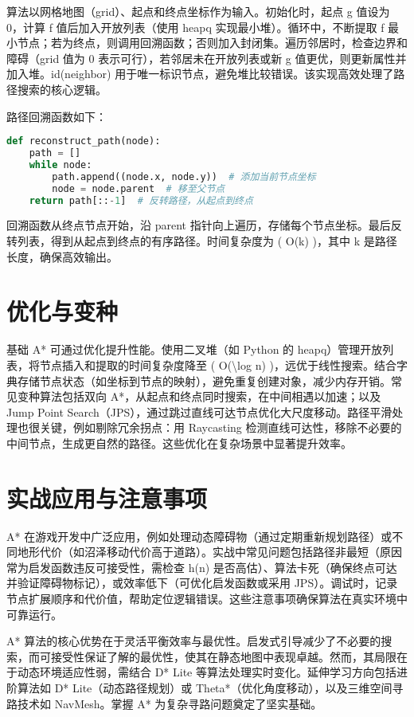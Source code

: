 算法以网格地图（grid）、起点和终点坐标作为输入。初始化时，起点 g 值设为 0，计算 f 值后加入开放列表（使用 heapq 实现最小堆）。循环中，不断提取 f 最小节点；若为终点，则调用回溯函数；否则加入封闭集。遍历邻居时，检查边界和障碍（grid 值为 0 表示可行），若邻居未在开放列表或新 g 值更优，则更新属性并加入堆。id(neighbor) 用于唯一标识节点，避免堆比较错误。该实现高效处理了路径搜索的核心逻辑。\par
路径回溯函数如下：\par
\begin{lstlisting}[language=python]
def reconstruct_path(node):
    path = []
    while node:
        path.append((node.x, node.y))  # 添加当前节点坐标
        node = node.parent  # 移至父节点
    return path[::-1]  # 反转路径，从起点到终点
\end{lstlisting}
回溯函数从终点节点开始，沿 parent 指针向上遍历，存储每个节点坐标。最后反转列表，得到从起点到终点的有序路径。时间复杂度为 ( O(k) )，其中 k 是路径长度，确保高效输出。\par
\chapter{优化与变种}
基础 A* 可通过优化提升性能。使用二叉堆（如 Python 的 heapq）管理开放列表，将节点插入和提取的时间复杂度降至 ( O(\textbackslash{}log n) )，远优于线性搜索。结合字典存储节点状态（如坐标到节点的映射），避免重复创建对象，减少内存开销。常见变种算法包括双向 A*，从起点和终点同时搜索，在中间相遇以加速；以及 Jump Point Search（JPS），通过跳过直线可达节点优化大尺度移动。路径平滑处理也很关键，例如剔除冗余拐点：用 Raycasting 检测直线可达性，移除不必要的中间节点，生成更自然的路径。这些优化在复杂场景中显著提升效率。\par
\chapter{实战应用与注意事项}
A* 在游戏开发中广泛应用，例如处理动态障碍物（通过定期重新规划路径）或不同地形代价（如沼泽移动代价高于道路）。实战中常见问题包括路径非最短（原因常为启发函数违反可接受性，需检查 h(n) 是否高估）、算法卡死（确保终点可达并验证障碍物标记），或效率低下（可优化启发函数或采用 JPS）。调试时，记录节点扩展顺序和代价值，帮助定位逻辑错误。这些注意事项确保算法在真实环境中可靠运行。\par
A* 算法的核心优势在于灵活平衡效率与最优性。启发式引导减少了不必要的搜索，而可接受性保证了解的最优性，使其在静态地图中表现卓越。然而，其局限在于动态环境适应性弱，需结合 D* Lite 等算法处理实时变化。延伸学习方向包括进阶算法如 D* Lite（动态路径规划）或 Theta*（优化角度移动），以及三维空间寻路技术如 NavMesh。掌握 A* 为复杂寻路问题奠定了坚实基础。\par
